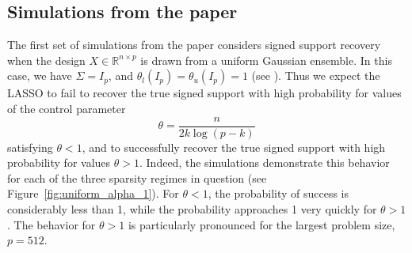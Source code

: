 \documentclass[letterpaper,12pt]{article}
\begin{document}
\subsection*{Simulations from the paper}

The first set of simulations from the paper considers signed support
recovery when the design $X \in \mathbb{R}^{n \times p}$ is drawn from
a uniform Gaussian ensemble. In this case, we have $\Sigma = I_p$, and
$\theta_l(I_p) = \theta_u(I_p) = 1$ (see \cite{wainwright06}). Thus we
expect the LASSO to fail to recover the true signed support with high
probability for values of the control parameter
\begin{equation*}
  \theta = \frac{n}{2k \log(p - k)}
\end{equation*}
satisfying $\theta < 1$, and to successfully recover the true signed
support with high probability for values $\theta > 1$. Indeed, the
simulations demonstrate this behavior for each of the three sparsity
regimes in question (see Figure~\ref{fig:uniform_alpha_1}). For
$\theta < 1$, the probability of success is considerably less than 1,
while the probability approaches 1 very quickly for $\theta > 1$. The
behavior for $\theta > 1$ is particularly pronounced for the largest
problem size, $p = 512$.
\end{document}
